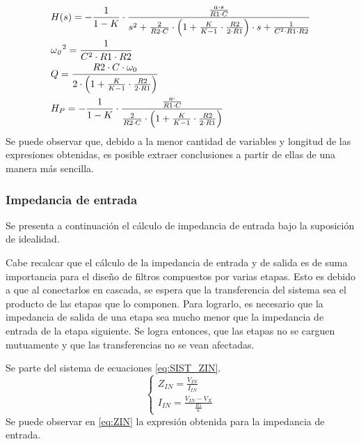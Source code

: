 \begin{equation}    
        \begin{split}    
            &H(s) = -\frac{1}{1-K}\cdot \frac{\frac{a\cdot s}{R1\cdot C}}{s^2+\frac{2}{R2\cdot C}\cdot \left(1+\frac{K}{K-1}\cdot \frac{R2}{2\cdot R1}\right)\cdot s+\frac{1}{C^2\cdot R1 \cdot R2}}\\
            &{{\it \omega_0}}^2=\frac{1}{C^2\cdot R1 \cdot R2}\\
            &Q=\frac{R2\cdot C\cdot \omega_0}{2\cdot\left(1+\frac{K}{K-1}\cdot \frac{R2}{2\cdot R1}\right)}\\
           & H_P = -\frac{1}{1-K}\cdot \frac{\frac{a\cdot }{R1\cdot C}}{\frac{2}{R2\cdot C}\cdot \left(1+\frac{K}{K-1}\cdot \frac{R2}{2\cdot R1}\right)}
        \end{split}    
    \label{eq:SOLUC_NEW_DESIGN}
\end{equation}
Se puede observar que, debido a la menor cantidad de variables y longitud de las expresiones obtenidas, es posible extraer conclusiones a partir de ellas de una manera m\'as sencilla.

\subsubsection{Impedancia de entrada}
Se presenta a continuaci\'on el c\'alculo de impedancia de entrada bajo la suposici\'on de  idealidad.

Cabe recalcar que el c\'alculo de la impedancia de entrada y de salida es de suma importancia para el dise\~no de filtros compuestos por varias etapas. Esto es debido a que al conectarlos en cascada, se espera que la transferencia del sistema sea el producto de las etapas que lo componen. Para lograrlo, es necesario que la impedancia de salida de una etapa sea mucho menor que la impedancia de entrada de la etapa siguiente. Se logra entonces, que las etapas no se carguen mutuamente y que las transferencias no se vean afectadas.

Se parte del sistema de ecuaciones \ref{eq:SIST_ZIN}.
\begin{equation}    
    \left\{
        \begin{array}{ll}
            Z_{IN} = \frac{V_{IN}}{I_{IN}}\\
            I_{IN} = \frac{V_{IN}-V_X}{\frac{R1}{a}}
            
        \end{array}
    \right.
    \label{eq:SIST_ZIN}
\end{equation}
Se puede observar en \ref{eq:ZIN} la expresi\'on obtenida para la impedancia de entrada. 

